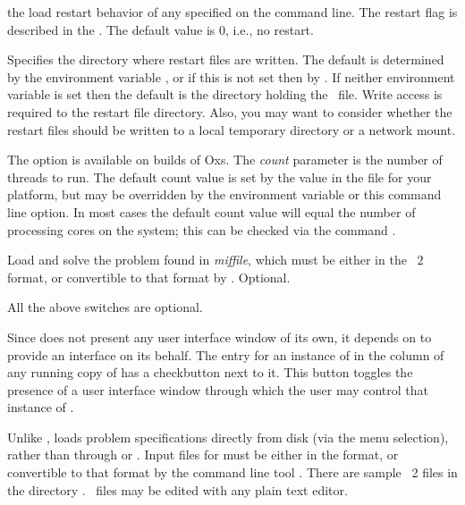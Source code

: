 \begin{description}
  the load restart behavior of any  specified on the command
  line.  The restart flag is described in the
  . The default value is 0, i.e., no
  restart.
\item[\optkey{-restartfiledir dir}]
  Specifies the directory where restart files are written.
  The default is determined by the environment variable
  ,
  or if this is not set then by
  .  If
  neither environment variable is set then the default is the
  directory holding the \MIF\ file.  Write access is required to the
  restart file directory.  Also, you may want to consider whether the
  restart files should be written to a local temporary directory or a
  network mount.
\item[\optkey{-threads \boa count\bca}]
  The option is available on  builds of Oxs.  The \textit{count}
  parameter is the number of threads to run.  The default count value is
  set by the  value in
  the  file for your platform, but may be
  overridden by
  the 
  environment variable or this command line option.  In most cases the
  default count value will equal the number of processing cores on the
  system; this can be checked via the command .
\item[\optkey{miffile}]
  Load and solve the problem found in \textit{miffile}, which must be
  either in the \MIF~2 format, or convertible to that format by
  .  Optional.
\end{description}
All the above switches are optional.

Since  does not present
any user interface window of its own, it depends on
 to provide an interface on
its behalf.  The entry for an instance of  in the
 column of any running copy of
 has a checkbutton next to it.  This button toggles the
presence of a user interface window through which the user may control
that instance of .


Unlike ,
 loads problem specifications
directly from disk (via the  menu selection),
rather than through
 or
.  Input files for  must be either
in the 
format, or convertible to that format by the command line tool
.  There are sample \MIF~2 files in the
directory .  \MIF\ files may be edited with
any plain text editor.

